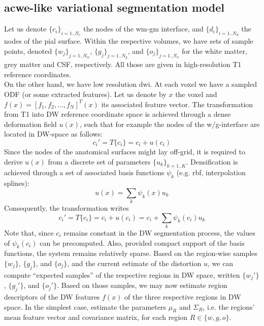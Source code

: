 \subsection{\acl{acwe}-like variational segmentation model}
%
Let us denote $\{c_i\}_{i=1..N_c}$ the nodes of the \ac{wm}-\ac{gm}
interface, and $\{d_i\}_{i=1..N_d}$ the nodes of the pial surface. 
Within the respective volumes, we have sets of sample points, denoted 
$\{w_j\}_{j=1..N_w}$, $\{g_j\}_{j=1..N_g}$, and $\{o_j\}_{j=1..N_o}$ 
for the white matter, grey matter and CSF, respectively. All those 
are given in high-resolution T1 reference coordinates.\\
%
On the other hand, we have low resolution \ac{dwi}. At each voxel 
we have a sampled ODF (or some extracted features).
Let us denote by $x$ the voxel and $f(x) = [ f_1, f_2, \ldots, f_N]^T(x)$ 
its associated feature vector.
%
The transformation from T1 into DW reference coordinate space is 
achieved through a dense deformation field $u(x)$, such that for example
the nodes of the w/g-interface are located in DW-space as follows:
%
\begin{equation}
c_i' = T\{c_i\} = c_i + u(c_i)
\end{equation}
% 
Since the nodes of the anatomical surfaces might lay off-grid, it is 
required to derive $u(x)$ from a discrete set of parameters $\{u_k\}_{k=1..K}$.
Densification is achieved through a set of associated basis functions 
$\psi_k$ (e.g. rbf, interpolation splines):
%
\begin{equation}
u(x) = \sum_k \psi_k(x) u_k
\end{equation}
%
Consequently, the transformation writes
%
\begin{equation}
c_i' = T\{c_i\} = c_i + u(c_i) = c_i + \sum_k \psi_k(c_i)u_k
\end{equation} 
%
Note that, since $c_i$ remains constant in the DW segmentation process,
the values of $\psi_k(c_i)$ can be precomputed. Also, provided compact 
support of the basis functions, the system remains relatively sparse.
%
Based on the region-wise samples $\{w_j\}$, $\{g_j\}$, and $\{o_j\}$, 
and the current estimate of the distortion $u$, we can compute 
``expected samples'' of the respective regions in DW space, written
$\{w_j'\}$, $\{g_j'\}$, and $\{o_j'\}$. Based on those samples, we may 
now estimate region descriptors of the DW features $f(x)$ of the three 
respective regions in DW space. In the simplest case, estimate the 
parameters $\mu_R$ and $\Sigma_R$, i.e. the regions' mean feature 
vector and covariance matrix, for each region $R\in \{w,g,o\}$.
